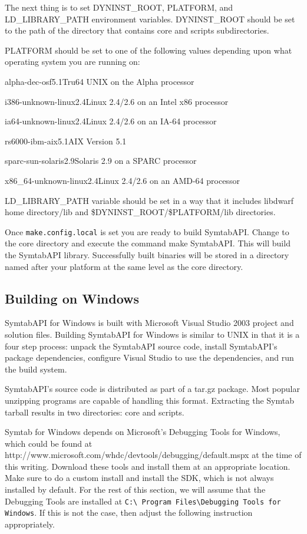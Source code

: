 The next thing is to set DYNINST\_ROOT, PLATFORM, and LD\_LIBRARY\_PATH
environment variables. DYNINST\_ROOT should be set to the path of the directory
that contains core and scripts subdirectories.

PLATFORM should be set to one of the following values depending upon what operating system you are running on:
\begin{description}
    \item alpha-dec-osf5.1Tru64 UNIX on the Alpha processor
    \item i386-unknown-linux2.4Linux 2.4/2.6 on an Intel x86 processor
    \item ia64-unknown-linux2.4Linux 2.4/2.6 on an IA-64 processor
    \item rs6000-ibm-aix5.1AIX Version 5.1
    \item sparc-sun-solaris2.9Solaris 2.9 on a SPARC processor
    \item x86\_64-unknown-linux2.4Linux 2.4/2.6 on an AMD-64 processor
\end{description}

LD\_LIBRARY\_PATH variable should be set in a way that it includes libdwarf home
directory/lib and \${DYNINST\_ROOT}/\${PLATFORM}/lib directories.

Once \texttt{make.config.local} is set you are ready to build SymtabAPI. Change
to the core directory and execute the command make SymtabAPI. This will build
the SymtabAPI library. Successfully built binaries will be stored in a directory
named after your platform at the same level as the core directory. 

\subsection{Building on Windows}

SymtabAPI for Windows is built with Microsoft Visual Studio 2003 project and
solution files.   Building SymtabAPI for Windows is similar to UNIX in that it
is a four step process: unpack the SymtabAPI source code, install SymtabAPI's
package dependencies, configure Visual Studio to use the dependencies, and run
the build system. 

SymtabAPI's source code is distributed as part of a tar.gz package. Most popular
unzipping programs are capable of handling this format. Extracting the Symtab
tarball results in two directories: core and scripts. 

Symtab for Windows depends on Microsoft's Debugging Tools for Windows, which
could be found at http://www.microsoft.com/whdc/devtools/debugging/default.mspx
at the time of this writing. Download these tools and install them at an
appropriate location. Make sure to do a custom install and install the SDK,
which is not always installed by default. For the rest of this section, we will
assume that the Debugging Tools are installed at \texttt{C:\textbackslash
    Program Files\textbackslash Debugging
Tools for Windows}. If this is not the case, then adjust the following
instruction appropriately.

